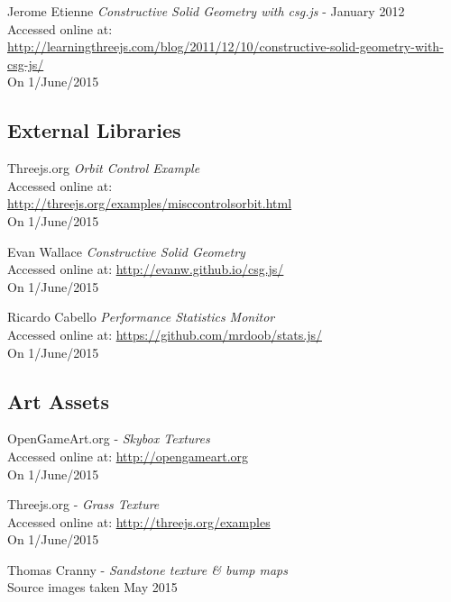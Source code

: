 \begin{thebibliography}{99}
        Jerome Etienne
        \textit{Constructive Solid Geometry with csg.js} - January 2012 \\
        Accessed online at: \\
        \href{http://learningthreejs.com/blog/2011/12/10/constructive-solid-geometry-with-csg-js/}{http://learningthreejs.com/blog/2011/12/10/constructive-solid-geometry-with-csg-js/}\\
        On 1/June/2015



\subsection{External Libraries}
        Threejs.org
        \textit{Orbit Control Example} \\
        Accessed online at: \\
        \href{http://threejs.org/examples/misc_controls_orbit.html}{http://threejs.org/examples/misc{\textunderscore}controls{\textunderscore}orbit.html} \\
        On 1/June/2015

        Evan Wallace
        \textit{Constructive Solid Geometry}\\
        Accessed online at:
        \href{http://evanw.github.io/csg.js/}{http://evanw.github.io/csg.js/} \\
        On 1/June/2015

        Ricardo Cabello
        \textit{Performance Statistics Monitor}\\
        Accessed online at:
        \href{https://github.com/mrdoob/stats.js/}{https://github.com/mrdoob/stats.js/}\\
        On 1/June/2015



\subsection{Art Assets}
\label{ref:art_assets}
        OpenGameArt.org -
        \textit{Skybox Textures}\\
        Accessed online at:
        \href{http://opengameart.org}{http://opengameart.org}\\
        On 1/June/2015

        Threejs.org - \textit{Grass Texture}\\
        Accessed online at:
        \href{http://threejs.org/examples/textures}{http://threejs.org/examples}\\
        On 1/June/2015

        Thomas Cranny - \textit{Sandstone texture \& bump maps}\\
        Source images taken May 2015



\end{thebibliography}